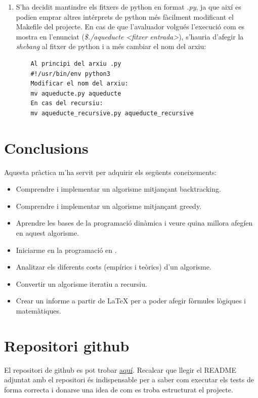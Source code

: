 \documentclass[12pt, letterpaper]{article}
\begin{document}
\begin{enumerate}
\item S'ha decidit mantindre els fitxers de python en format \textit{.py}, ja que així es podien emprar altres intérprets de python més fàcilment modificant el Makefile del projecte. En cas de que l'avaluador volgués l'execució com es mostra 
    en l'enunciat (\textit{\$./aqueducte <fitxer entrada>}), s'hauria d'afegir la \textit{shebang} al fitxer de python i a més cambiar el nom del arxiu:
    \begin{verbatim}
    Al principi del arxiu .py
    #!/usr/bin/env python3
    Modificar el nom del arxiu:
    mv aqueducte.py aqueducte
    En cas del recursiu:
    mv aqueducte_recursive.py aqueducte_recursive
    \end{verbatim}
\end{enumerate}

\section{Conclusions}
Aquesta pràctica m'ha servit per adquirir els següents coneixements:
\begin{itemize}
    \item Comprendre i implementar un algorisme mitjançant backtracking.
    \item Comprendre i implementar un algorisme mitjançant greedy.
    \item Aprendre les bases de la programació dinàmica i veure quina millora afegíen en aquest algorisme.
    \item Iniciarme en la programació en \cpluspluslogo.
    \item Analitzar els diferents costs (empírics i teòrics) d'un algorisme.
    \item Convertir un algorisme iteratiu a recursiu.
    \item Crear un informe a partir de {\LaTeX} per a poder afegir fòrmules lògiques i matemàtiques.
\end{itemize}

\newpage

\appendix

\section{Repositori github}
\label{github}

El repositori de github es pot trobar \href{https://github.com/Algorismia/Aquaeductus-Optimus}{aquí}. Recalcar que llegir el README adjuntat amb el repositori és indispensable per a saber com executar els tests de forma correcta i donarse una idea de com es troba estructurat el projecte. 
\end{document}
